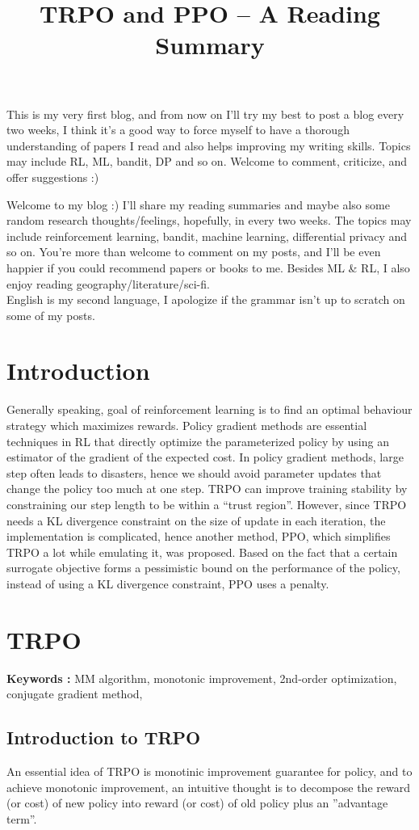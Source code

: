 \documentclass{article}
\title{TRPO and PPO -- A Reading Summary}
\author{}
\date{}
\begin{document}
This is my very first blog, and from now on I'll try my best to post a blog every two weeks, I think it's a good way to force myself to have a thorough understanding of papers I read and also helps improving my writing skills. Topics may include RL, ML, bandit, DP and so on. Welcome to comment, criticize, and offer suggestions  :)

Welcome to my blog :) 
I'll share my reading summaries and maybe also some random research thoughts/feelings, hopefully, in every two weeks. The topics may include reinforcement learning, bandit, machine learning, differential privacy and so on. You're more than welcome to comment on my posts, and I'll be even happier if you could recommend papers or books to me. Besides ML \& RL, I also enjoy reading geography/literature/sci-fi. \\
English is my second language, I apologize if the grammar isn’t up to scratch on some of my posts.
\maketitle
\section{Introduction}
Generally speaking, goal of reinforcement learning is to find an optimal behaviour strategy which maximizes rewards. Policy gradient methods are essential techniques in RL that directly optimize the parameterized policy by using an estimator of the gradient of the expected cost. In policy gradient methods, large step often leads to disasters, hence we should avoid  parameter updates that change the policy too much at one step. TRPO can improve training stability by constraining our step length to be within a “trust region”. However, since TRPO needs a KL divergence constraint on the size of update in each iteration, the implementation is complicated, hence another method, PPO, which simplifies TRPO a lot while emulating it, was proposed. Based on the fact that a certain surrogate objective forms a pessimistic bound on the performance of the policy, instead of using a KL divergence constraint, PPO uses a penalty.

\section{TRPO}
\textbf{Keywords : }MM algorithm, monotonic improvement, 2nd-order optimization, conjugate gradient method, 

\subsection{Introduction to TRPO}
An essential idea of TRPO is monotinic improvement guarantee for policy, and to achieve monotonic improvement, an intuitive thought is to decompose the reward (or cost) of new policy into reward (or cost) of old policy plus an ''advantage term''. \\
\end{document}

